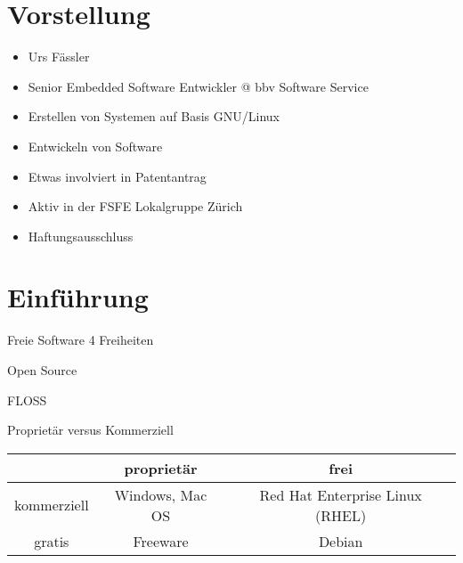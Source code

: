 \section{Vorstellung}
\begin{frame}
  \begin{itemize}
    \item Urs Fässler
    \item Senior Embedded Software Entwickler @ bbv Software Service
    \item Erstellen von Systemen auf Basis GNU/Linux
    \item Entwickeln von Software
    \item Etwas involviert in Patentantrag
    \item Aktiv in der FSFE Lokalgruppe Zürich
  \end{itemize}
\end{frame}

\begin{frame}
  \begin{itemize}
    \item Haftungsausschluss
  \end{itemize}
\end{frame}

\section{Einführung}

\begin{frame}{Freie Software}
  4 Freiheiten
\end{frame}

\begin{frame}{Open Source}
\end{frame}

\begin{frame}{FLOSS}
\end{frame}

\begin{frame}{Proprietär versus Kommerziell}
  \begin{center}
    \begin{tabular}{|c|c|c|}
    \hline 
     & proprietär &  frei \\ 
    \hline 
    kommerziell & Windows, Mac OS & Red Hat Enterprise Linux (RHEL) \\ 
    \hline 
    gratis & Freeware & Debian \\ 
    \hline 
    \end{tabular} 
  \end{center}
\end{frame}

